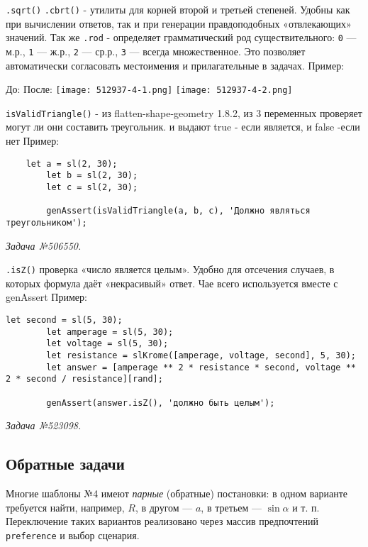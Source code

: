 \texttt{.sqrt()} \texttt{.cbrt()} - утилиты для корней второй и третьей степеней. Удобны как при вычислении ответов, так и при генерации правдоподобных «отвлекающих» значений.
Так же \texttt{.rod} - определяет грамматический род существительного: \verb|0| — м.р., \verb|1| — ж.р., \verb|2| — ср.р., \verb|3| — всегда множественное. 
Это позволяет автоматически согласовать местоимения и прилагательные в задачах.
Пример:
 
До:
После:
\texttt{[image: 512937-4-1.png]}
\texttt{[image: 512937-4-2.png]}


\texttt{isValidTriangle()} - из  flatten-shape-geometry 1.8.2, из 3 переменных проверяет могут ли они составить треугольник. и выдают true - если является, и false -если нет
Пример:
\begin{lstlisting}
	let a = sl(2, 30);
		let b = sl(2, 30);
		let c = sl(2, 30);

		genAssert(isValidTriangle(a, b, c), 'Должно являться треугольником');
\end{lstlisting}
\textsl{Задача №506550.}

\texttt{.isZ()} проверка «число является целым». Удобно для отсечения случаев, в которых формула даёт «некрасивый» ответ. Чае всего используется вместе с genAssert   
Пример:
\begin{lstlisting}
let second = sl(5, 30);
		let amperage = sl(5, 30);
		let voltage = sl(5, 30);
		let resistance = slKrome([amperage, voltage, second], 5, 30);
		let answer = [amperage ** 2 * resistance * second, voltage ** 2 * second / resistance][rand];

		genAssert(answer.isZ(), 'должно быть целым');
\end{lstlisting}
\textsl{Задача №523098.}




\subsection{Обратные задачи}
Многие шаблоны №4 имеют \emph{парные} (обратные) постановки: в одном варианте требуется найти, например, \(R\), в другом — \(a\), в третьем — \(\sin\alpha\) и т. п. 
Переключение таких вариантов реализовано через массив предпочтений \verb|preference| и выбор сценария. 

